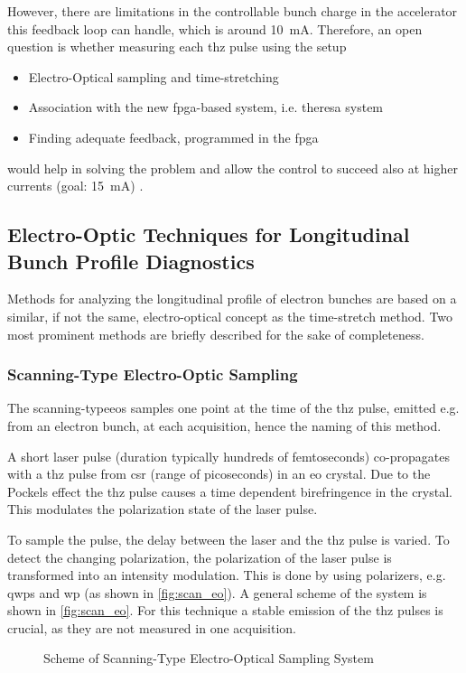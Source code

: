 However, there are limitations in the controllable bunch charge in the accelerator this feedback loop can handle, which is around \SI{10}{\milli \ampere}. 
Therefore, an open question is whether measuring each \gls{thz} pulse using the setup
\begin{itemize}
	\item Electro-Optical sampling and time-stretching
	\item Association with the new \gls{fpga}-based system, i.e. \gls{theresa} system
	\item Finding adequate feedback, programmed in the \gls{fpga}
\end{itemize}
would help in solving the problem and allow the control to succeed also at higher currents (goal: \SI{15}{\milli \ampere}) \cite{bielwaski}.

\subsection{Electro-Optic Techniques for Longitudinal Bunch Profile Diagnostics}
Methods for analyzing the longitudinal profile of electron bunches are based on a similar, if not the same, electro-optical concept as the time-stretch method. 
Two most prominent methods are briefly described for the sake of completeness.
\subsubsection*{Scanning-Type Electro-Optic Sampling}
The scanning-type\gls{eos} samples one point at the time of the \gls{thz} pulse, emitted e.g. from an electron bunch, at each acquisition, hence the naming of this method.

A short laser pulse (duration typically hundreds of femtoseconds) co-propagates with a \gls{thz} pulse from \gls{csr} (range of picoseconds) in an \gls{eo} crystal. 
Due to the Pockels effect the \gls{thz} pulse causes a time dependent birefringence in the crystal.
This modulates the polarization state of the laser pulse.

To sample the pulse, the delay between the laser and the \gls{thz} pulse is varied.
To detect the changing polarization, the polarization of the laser pulse is transformed into an intensity modulation. This is done by using polarizers, e.g. \glspl{qwp} and \gls{wp} (as shown in \autoref{fig:scan_eo}).
A general scheme of the system is shown in \autoref{fig:scan_eo}.
For this technique a stable emission of the \gls{thz} pulses is crucial, as they are not measured in one acquisition. \cite{roussel2014}
\begin{figure}[tb]
	\centering
	\resizebox{1\textwidth}{!}{}
	\caption{Scheme of Scanning-Type Electro-Optical Sampling System \cite{roussel2014}}
	\label{fig:scan_eo}
\end{figure}


